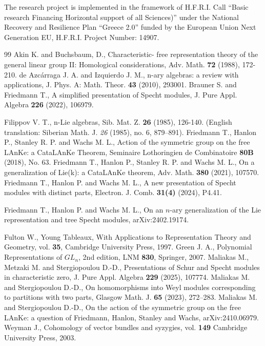 \documentclass[11pt]{amsart}
\theoremstyle{definition}
\numberwithin{equation}{section}
\begin{document}
The research project is implemented in the framework of H.F.R.I. Call “Basic research Financing Horizontal support of all Sciences)” under the National Recovery and Resilience Plan “Greece 2.0” funded by the European Union Next Generation EU, H.F.R.I.  
Project Number: 14907.
\begin{thebibliography}{99}
	Akin K. and Buchsbaum, D., Characteristic- free representation theory of the general linear group II: Homological considerations, Adv. Math. \textbf{72} (1988), 172-210.
		de Azcárraga J. A. and  Izquierdo J. M., n-ary algebras: a review with applications, J. Phys. A: Math. Theor. \textbf{43} (2010), 293001.
	Brauner S. and Friedmann T., A simplified presentation of Specht modules, J. Pure Appl. Algebra \textbf{226} (2022), 106979. 
	
		 Filippov V. T., n-Lie algebras, Sib. Mat. Z. \textbf{26} (1985), 126-140. (English translation:
	Siberian Math. J. \textit{26} (1985), no. 6, 879–891).
	Friedmann T., Hanlon P., Stanley R. P. and Wachs M. L., Action of the symmetric group on the free LAnKe: a CataLAnKe Theorem, Seminaire Lothoringien de Combinatoire \textbf{80B} (2018), No. 63.
	Friedmann T., Hanlon P., Stanley R. P. and Wachs M. L., On a generalization of Lie(k): a CataLAnKe theorem, Adv. Math. \textbf{380} (2021), 107570.
Friedmann T., Hanlon P. and Wachs M. L., A new presentation of Specht modules with distinct parts, Electron. J. Comb. \textbf{31(4)} (2024), P4.41.

Friedmann T., Hanlon P. and Wachs M. L., On an $n$-ary generalization of the Lie representation and tree Specht modules, arXiv:2402.19174.

	Fulton W., Young Tableaux, With Applications to Representation Theory and Geometry, vol. \textbf{35}, Cambridge University Press, 1997.
	Green J. A., Polynomial Representations of $GL_n$, 2nd edition, LNM \textbf{830}, Springer, 2007.
	Maliakas M., Metzaki M. and Stergiopoulou D.-D., Presentations of Schur and Specht modules in characteristic zero, J. Pure Appl. Algebra
	\textbf{229} (2025), 107774.
	Maliakas M. and Stergiopoulou D.-D., On homomorphisms into Weyl modules corresponding to partitions with two parts, Glasgow Math. J. \textbf{65} (2023), 272--283.
	Maliakas M. and Stergiopoulou D.-D., On the action of the symmetric group on the free LAnKe: a question of Friedmann, Hanlon, Stanley and Wachs, arXiv:2410.06979.
	 Weyman J., Cohomology of vector bundles and syzygies, vol. \textbf{149} Cambridge University Press, 2003.
	
\end{thebibliography}



\end{document}
